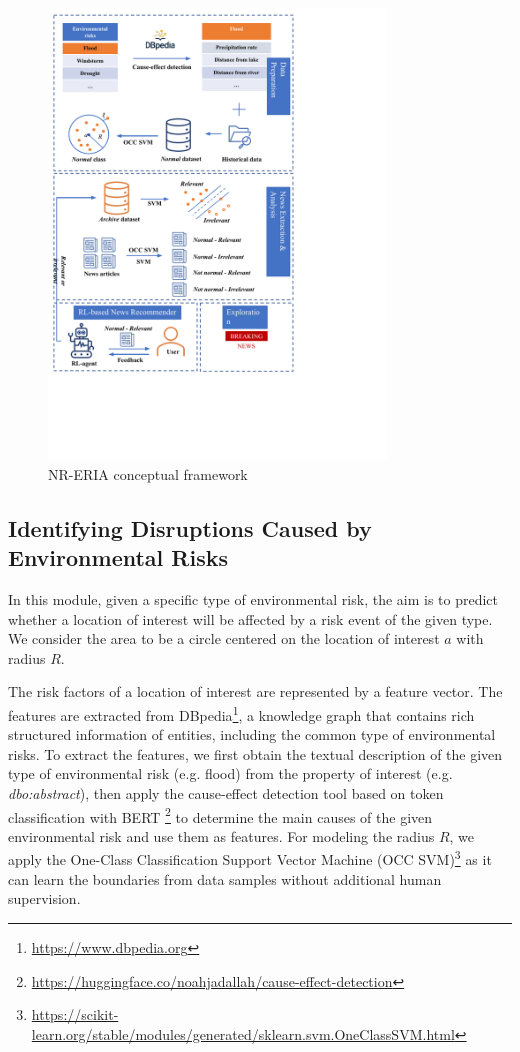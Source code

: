 \documentclass[]{ceurart}
\begin{document}
\begin{figure}[h]
  \centering
  
  \includegraphics[page=2,trim=0cm 4.5cm 3cm 0.5cm, width=0.8\textwidth]{photo/overview.pdf}
  \caption{NR-ERIA conceptual framework}\label{RL-ERIA}
  \vspace{-0.2in}
\end{figure}

\subsection{Identifying Disruptions Caused by Environmental Risks} \label{sec:radius}

In this module, given a specific type of environmental risk, the aim is to predict whether a location of interest will be affected by a risk event of the given type. 
We consider the area to be a circle centered on the location of interest $a$ with radius $R$. 

The risk factors of a location of interest are represented by a feature vector. The features are extracted from DBpedia\footnote{\url{https://www.dbpedia.org}}, a knowledge graph that contains rich structured information of entities, including the common type of environmental risks. To extract the features, we first obtain the textual description of the given type of environmental risk (e.g. flood) from the property of interest (e.g. \textit{dbo:abstract}), then apply the cause-effect detection tool based on token classification with BERT \footnote{\url{https://huggingface.co/noahjadallah/cause-effect-detection}} to determine the main causes of the given environmental risk and use them as features. 
For modeling the radius $R$, we apply the One-Class Classification Support Vector Machine (OCC SVM)\footnote{\url{https://scikit-learn.org/stable/modules/generated/sklearn.svm.OneClassSVM.html}} \cite{DBLP:journals/neco/ScholkopfPSSW01} as it can learn the boundaries from data samples without additional human supervision. 
\end{document}
